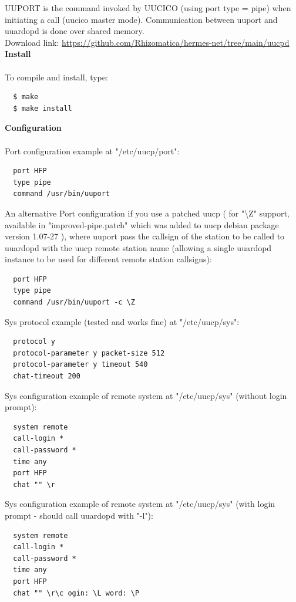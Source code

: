 \documentclass[11pt,a4paper]{article}
\begin{document}
UUPORT is the command invoked by UUCICO (using port type = pipe) when initiating a call (uucico master mode). Communication between uuport and uuardopd is done over shared memory. \\

Download link: \url{https://github.com/Rhizomatica/hermes-net/tree/main/uucpd} \\

\textbf{Install} \\
\\
To compile and install, type:
\begin{verbatim}
  $ make
  $ make install    
\end{verbatim}

\textbf{Configuration} \\
\\
Port configuration example at "/etc/uucp/port":
\begin{verbatim}
  port HFP
  type pipe
  command /usr/bin/uuport    
\end{verbatim}

An alternative Port configuration if you use a patched uucp ( for "\textbackslash Z" support, available in "improved-pipe.patch" which was added to uucp debian package version 1.07-27 ), where uuport pass the callsign of the station to be called to uuardopd with the uucp remote station name (allowing a single uuardopd instance to be used for different remote station callsigns):
\begin{verbatim}
  port HFP
  type pipe
  command /usr/bin/uuport -c \Z
\end{verbatim}

Sys protocol example (tested and works fine) at "/etc/uucp/sys":
\begin{verbatim}
  protocol y
  protocol-parameter y packet-size 512
  protocol-parameter y timeout 540
  chat-timeout 200
\end{verbatim}

Sys configuration example of remote system at "/etc/uucp/sys" (without login prompt):
\begin{verbatim}
  system remote
  call-login *
  call-password *
  time any
  port HFP
  chat "" \r
\end{verbatim}

Sys configuration example of remote system at "/etc/uucp/sys" (with login prompt - should call uuardopd with "-l"):
\begin{verbatim}
  system remote
  call-login *
  call-password *
  time any
  port HFP
  chat "" \r\c ogin: \L word: \P
\end{verbatim}
\end{document}
